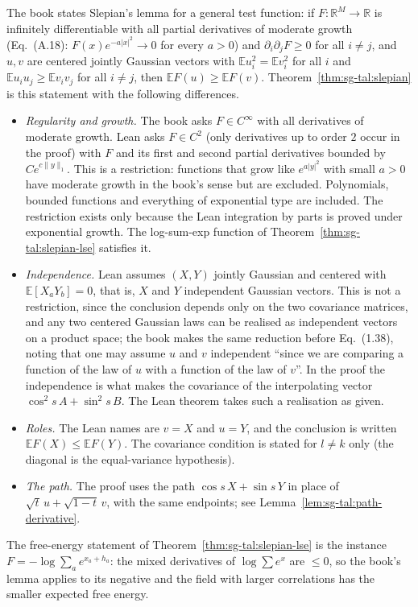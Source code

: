 \begin{remark}\label{rem:sg-tal:slepian-compare}
The book states Slepian's lemma for a general test function: if $F:\mathbb R^M\to\mathbb R$ is infinitely differentiable with all partial derivatives of moderate growth (Eq.~(A.18): $F(x)e^{-a|x|^2}\to0$ for every $a>0$) and $\partial_i\partial_jF\ge0$ for all $i\ne j$, and $u,v$ are
centered jointly Gaussian vectors with $\mathbb{E}u_i^2=\mathbb{E}v_i^2$ for all $i$ and $\mathbb{E}u_iu_j\ge\mathbb{E}v_iv_j$ for all $i\ne j$, then $\mathbb{E}F(u)\ge\mathbb{E}F(v)$.
Theorem~\ref{thm:sg-tal:slepian} is this statement with the following differences.
\begin{itemize}
\item \emph{Regularity and growth.} The book asks $F\in C^\infty$ with all derivatives of moderate growth. Lean asks $F\in C^2$ (only derivatives up to order $2$ occur in the proof) with $F$ and its first and second partial derivatives bounded by $Ce^{c\|y\|_1}$. This is a restriction: functions that grow like $e^{a|y|^2}$ with small $a>0$ have moderate growth in the book's sense but are excluded. Polynomials, bounded functions and everything of exponential type are included. The restriction exists only because the Lean integration by parts is proved under exponential growth. The log-sum-exp function of Theorem~\ref{thm:sg-tal:slepian-lse} satisfies it.
\item \emph{Independence.} Lean assumes $(X,Y)$ jointly Gaussian and centered with $\mathbb{E}[X_aY_b]=0$, that is, $X$ and $Y$ independent Gaussian vectors. This is not a restriction, since the conclusion depends only on the two covariance matrices,
  and any two centered Gaussian laws can be realised as independent vectors on a product space; the book makes the same reduction before Eq.~(1.38), noting that one may assume $u$ and $v$ independent ``since we are comparing a function of the law of $u$ with a function of the law of $v$''. In the proof the independence is what makes the covariance of the interpolating vector $\cos^2s\,A+\sin^2s\,B$. The Lean theorem takes such a realisation as given.
\item \emph{Roles.} The Lean names are $v=X$ and $u=Y$, and the conclusion is written $\mathbb{E}F(X)\le\mathbb{E}F(Y)$. The covariance condition is stated for $l\ne k$ only (the diagonal is the equal-variance hypothesis).
\item \emph{The path.} The proof uses the path $\cos s\,X+\sin s\,Y$ in place of $\sqrt t\,u+\sqrt{1-t}\,v$, with the same endpoints; see Lemma~\ref{lem:sg-tal:path-derivative}.
\end{itemize}
The free-energy statement of Theorem~\ref{thm:sg-tal:slepian-lse} is the instance $F=-\log\sum_ae^{x_a+h_a}$: the mixed derivatives of $\log\sum e^{x}$ are $\le0$, so the book's lemma applies to its negative and the field with larger correlations has the smaller expected free energy.
\end{remark}

